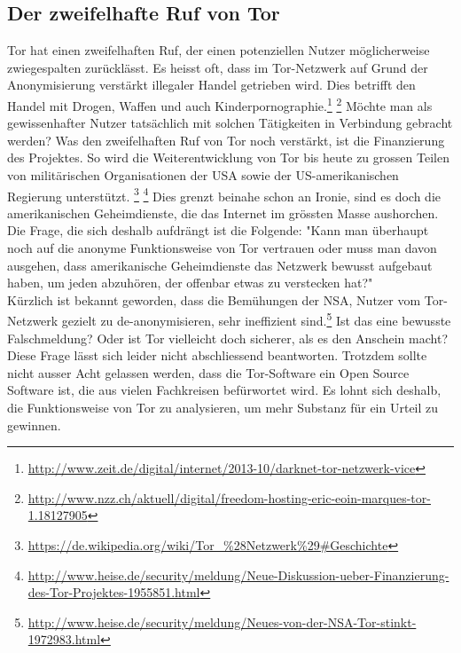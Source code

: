\subsection{Der zweifelhafte Ruf von Tor}
Tor hat einen zweifelhaften Ruf, der einen potenziellen Nutzer möglicherweise zwiegespalten zurücklässt.
Es heisst oft, dass im Tor-Netzwerk auf Grund der Anonymisierung verstärkt illegaler Handel getrieben wird.
Dies betrifft den Handel mit Drogen, Waffen und auch Kinderpornographie.\footnote{\url{http://www.zeit.de/digital/internet/2013-10/darknet-tor-netzwerk-vice}} \footnote{\url{http://www.nzz.ch/aktuell/digital/freedom-hosting-eric-eoin-marques-tor-1.18127905}}
Möchte man als gewissenhafter Nutzer tatsächlich mit solchen Tätigkeiten in Verbindung gebracht werden?
Was den zweifelhaften Ruf von Tor noch verstärkt, ist die Finanzierung des Projektes.
So wird die Weiterentwicklung von Tor bis heute zu grossen Teilen von militärischen Organisationen der USA sowie der US-amerikanischen Regierung  unterstützt.
\footnote{\url{https://de.wikipedia.org/wiki/Tor_\%28Netzwerk\%29\#Geschichte}}
\footnote{\url{http://www.heise.de/security/meldung/Neue-Diskussion-ueber-Finanzierung-des-Tor-Projektes-1955851.html}}
Dies grenzt beinahe schon an Ironie, sind es doch die amerikanischen Geheimdienste, die das Internet im grössten Masse aushorchen. Die Frage, die sich deshalb aufdrängt ist die Folgende: "Kann man überhaupt noch auf die anonyme Funktionsweise von Tor vertrauen oder muss man davon ausgehen, dass amerikanische Geheimdienste das Netzwerk bewusst aufgebaut haben, um jeden abzuhören, der offenbar etwas zu verstecken hat?"
\\
Kürzlich ist bekannt geworden, dass die Bemühungen der NSA, Nutzer vom Tor-Netzwerk gezielt zu de-anonymisieren, sehr ineffizient sind.\footnote{\url{http://www.heise.de/security/meldung/Neues-von-der-NSA-Tor-stinkt-1972983.html}}
Ist das eine bewusste Falschmeldung? Oder ist Tor vielleicht doch sicherer, als es den Anschein macht? Diese Frage lässt sich leider nicht abschliessend beantworten. Trotzdem sollte nicht ausser Acht gelassen werden, dass die Tor-Software ein Open Source Software ist, die aus vielen Fachkreisen befürwortet wird. Es lohnt sich deshalb, die Funktionsweise von Tor zu analysieren, um mehr Substanz für ein Urteil zu gewinnen.


